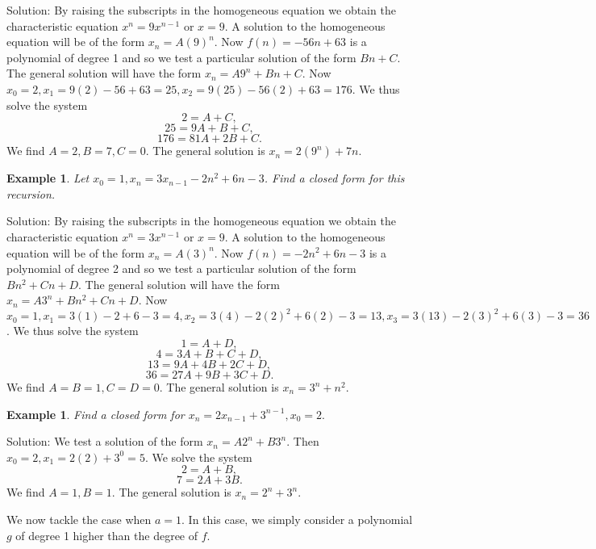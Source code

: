 \documentclass[11pt, openany]{book}
\theoremstyle{change} \theoremheaderfont{\blue\sffamily\bfseries}
\newtheorem{exa}[thm]{Example}
\theoremstyle{nonumberplain} \theoremheaderfont{\sffamily\bfseries}
\newcommand{\í}{\'{\i}}
\begin{document}
Solution: By raising the subscripts in the homogeneous equation
we obtain the characteristic equation $x^n = 9x^{n - 1}$ or $x =
9$. A solution to the homogeneous equation will be of the form
$x_n = A(9)^n$. Now $f(n) = -56n + 63$ is a polynomial of degree 1
and so we test a particular solution of the form $Bn + C$. The
general solution will have the form $x_n = A9^n + Bn + C$. Now
$x_0 = 2, x_1 = 9(2) - 56 + 63 = 25, x_2 = 9(25) - 56(2) + 63 =
176$. We thus solve the system
$$2 = A + C,$$
$$25 = 9A + B + C,$$
$$176 = 81A + 2B + C.$$
We find $A = 2, B = 7, C = 0.$ The general solution is $x_n =
2(9^n) + 7n.$
\begin{exa}
Let $x_0 = 1, x_n = 3x_{n - 1} - 2n^2 + 6n - 3$. Find a closed
form for this recursion.
\end{exa}
Solution: By raising the subscripts in the homogeneous equation
we obtain the characteristic equation $x^n = 3x^{n - 1}$ or $x =
9$. A solution to the homogeneous equation will be of the form
$x_n = A(3)^n$. Now $f(n) = - 2n^2 + 6n - 3$ is a polynomial of
degree 2 and so we test a particular solution of the form $Bn^2 +
Cn + D$. The general solution will have the form $x_n = A3^n +
Bn^2 + Cn + D$. Now $x_0 = 1, x_1 = 3(1) - 2 + 6 - 3 = 4, x_2 =
3(4) - 2(2)^2 + 6(2) - 3 = 13, x_3 = 3(13) - 2(3)^2 + 6(3) - 3 =
36$. We thus solve the system
$$1 = A + D,$$
$$4 = 3A + B + C + D,$$
$$13 = 9A + 4B + 2C + D,$$
$$36 = 27A + 9B + 3C + D.$$
We find $A = B = 1, C = D = 0.$ The general solution is $x_n = 3^n
+ n^2.$

\begin{exa}
Find a closed form for $x_{n} = 2x_{n - 1} + 3^{n - 1}, x_0 = 2.$
\end{exa}
Solution: We test a solution of the form $x_n = A2^n + B3^n$. Then
$x_0 = 2, x_1 = 2(2) + 3^0 = 5.$ We solve the system
$$2 = A + B,$$
$$7 = 2A + 3B.$$We find $A = 1, B = 1.$ The general solution is $x_n = 2^n + 3^n.$




We now tackle the case when $a = 1.$ In this case, we simply
consider a polynomial $g$ of degree 1 higher than the degree of
$f$.
\end{document}
